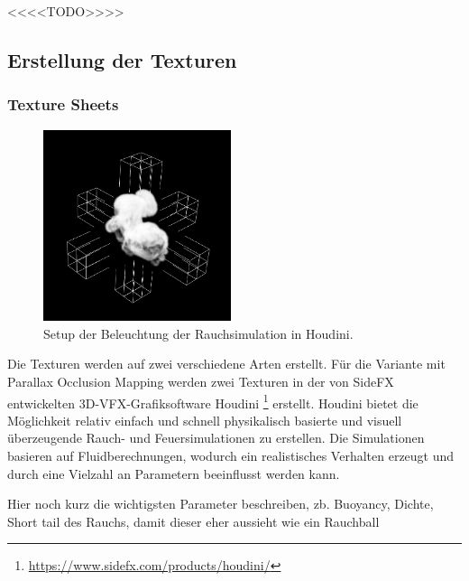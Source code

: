 <<<<TODO>>>>


\subsection{Erstellung der Texturen}
\label{sec:4.2}


\subsubsection{Texture Sheets}
\label{sec:4.2.1}
\begin{figure}[h!]
	\includegraphics[width=0.49\textwidth]{Grafiken/Implementation/Lightmaps/Smoke_LightSetup.png}
	\centering
	\begin{footnotesize}
		\caption{Setup der Beleuchtung der Rauchsimulation in Houdini.}
		\label{fig:lightSetup}
	\end{footnotesize}
\end{figure}

Die Texturen werden auf zwei verschiedene Arten erstellt. Für die Variante mit Parallax Occlusion Mapping werden zwei
Texturen in der von SideFX entwickelten 3D-VFX-Grafiksoftware Houdini \footnote{\url{https://www.sidefx.com/products/houdini/}} erstellt.
Houdini bietet die Möglichkeit relativ einfach und schnell physikalisch basierte und visuell überzeugende Rauch- und Feuersimulationen zu erstellen.
Die Simulationen basieren auf Fluidberechnungen, wodurch ein realistisches Verhalten erzeugt und durch eine Vielzahl an Parametern beeinflusst werden kann.

Hier noch kurz die wichtigsten Parameter beschreiben, zb. Buoyancy, Dichte, Short tail des Rauchs, damit dieser eher aussieht wie ein Rauchball

